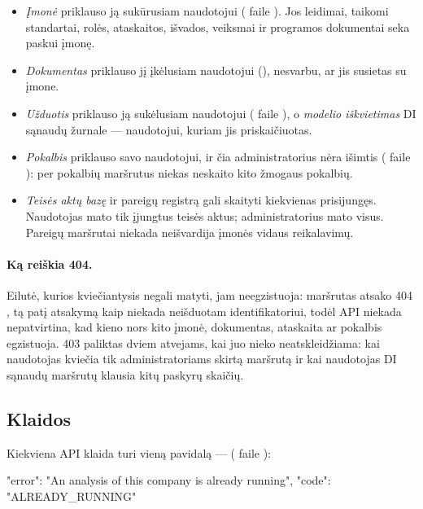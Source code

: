 \begin{itemize}
  \item \emph{Įmonė} priklauso ją sukūrusiam naudotojui ( faile
    ). Jos leidimai, taikomi standartai, rolės, ataskaitos,
    išvados, veiksmai ir programos dokumentai seka paskui įmonę.
  \item \emph{Dokumentas} priklauso jį įkėlusiam naudotojui (), nesvarbu,
    ar jis susietas su įmone.
  \item \emph{Užduotis} priklauso ją sukėlusiam naudotojui ( faile
    ), o \emph{modelio iškvietimas} DI sąnaudų žurnale --- naudotojui,
    kuriam jis priskaičiuotas.
  \item \emph{Pokalbis} priklauso savo naudotojui, ir čia administratorius nėra išimtis
    ( faile ): per pokalbių maršrutus niekas
    neskaito kito žmogaus pokalbių.
  \item \emph{Teisės aktų bazę} ir pareigų registrą gali skaityti kiekvienas prisijungęs.
    Naudotojas mato tik įjungtus teisės aktus; administratorius mato visus. Pareigų maršrutai niekada
    neišvardija įmonės vidaus reikalavimų.
\end{itemize}

\paragraph{Ką reiškia 404.} Eilutė, kurios kviečiantysis negali matyti, jam neegzistuoja: maršrutas
atsako 404 , tą patį atsakymą kaip niekada neišduotam identifikatoriui, todėl API
niekada nepatvirtina, kad kieno nors kito įmonė, dokumentas, ataskaita ar pokalbis egzistuoja. 403
paliktas dviem atvejams, kai juo nieko neatskleidžiama: kai naudotojas kviečia tik
administratoriams skirtą maršrutą ir kai naudotojas DI sąnaudų maršrutų klausia kitų paskyrų
skaičių.

\subsection{Klaidos}\label{sec:api:errors}

Kiekviena API klaida turi vieną pavidalą ---  ( faile
):

\begin{codeblock}
{"error": "An analysis of this company is already running", "code": "ALREADY_RUNNING"}
\end{codeblock}

